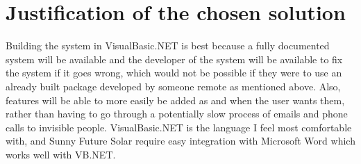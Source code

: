 	\section{Justification of the chosen solution}
Building the system in VisualBasic.NET is best because a fully documented
system will be available and the developer of the system will be available
to fix the system if it goes wrong, which would not be possible if they
were to use an already built package developed by someone remote as
mentioned above.  Also, features will be able to more easily be added as
and when the user wants them, rather than having to go through a
potentially slow process of emails and phone calls to invisible people.  VisualBasic.NET is the language I feel most comfortable with, and Sunny Future Solar require easy integration with Microsoft Word which works well with VB.NET.
